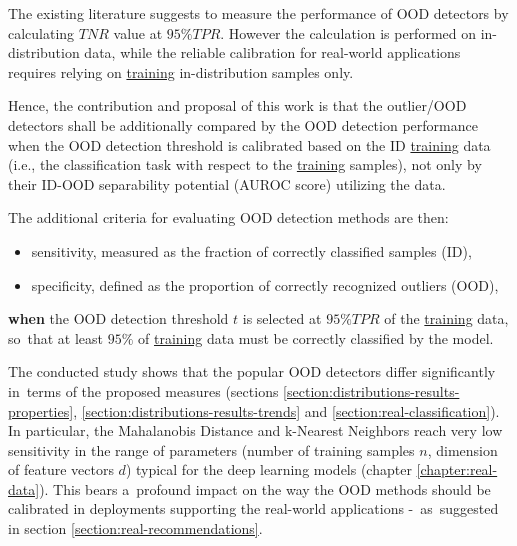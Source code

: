 The existing literature \cite{Lee-2018} suggests to measure the performance of OOD detectors by calculating $TNR$ value at $95\%TPR$. However the calculation is performed on  in-distribution data, while the reliable calibration for real-world applications requires relying on \underline{training} in-distribution samples only.

Hence, the contribution and proposal of this work is that the outlier/OOD detectors shall be additionally compared by the OOD detection performance when the OOD detection threshold is calibrated based on the ID \underline{training} data (i.e., the classification task with respect to the \underline{training} samples), not only by their ID-OOD separability potential (AUROC score) utilizing the  data.

The additional criteria for evaluating OOD detection methods are then:
\vspace{-0.5\baselineskip}
\begin{itemize}
    \item sensitivity, measured as the fraction of correctly classified  samples (ID),
    \item specificity, defined as the proportion of correctly recognized outliers (OOD),
\end{itemize}
\textbf{when}\marginpar[\hspace{2.1em}\LARGE{(!)}]{\hspace{1.1em}\LARGE{(!)}} the OOD detection threshold $t$ is selected at $95\% TPR$ of the \underline{training} data, so~that at least $95\%$ of \underline{training} data must be correctly classified by the model.

The conducted study shows that the popular OOD detectors differ significantly in~terms of the proposed measures (sections \ref{section:distributions-results-properties}, \ref{section:distributions-results-trends} and \ref{section:real-classification}). In particular, the Mahalanobis Distance and k-Nearest Neighbors reach very low sensitivity in the range of parameters (number of training samples $n$, dimension of feature vectors $d$) typical for the deep learning models (chapter \ref{chapter:real-data}). This bears a~profound impact on the way the OOD methods should be calibrated in deployments supporting the real-world applications -~as~suggested in section \ref{section:real-recommendations}.
